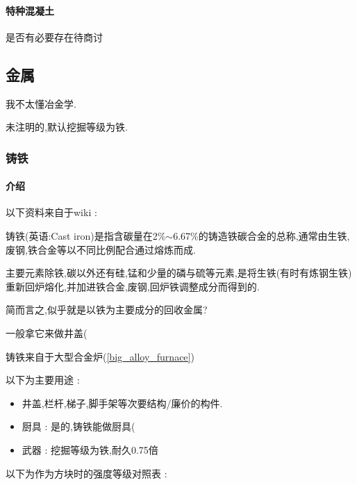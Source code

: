 {{{          \paragraph{特种混凝土}{
              是否有必要存在待商讨
          }
      }

  }

  \subsection{金属}{
      我不太懂冶金学.

      未注明的,默认挖掘等级为铁.

      \subsubsection{铸铁}{
          \paragraph{介绍}{
              以下资料来自于wiki :

              铸铁(英语:Cast iron)是指含碳量在2\%$\sim$6.67\%的铸造铁碳合金的总称,通常由生铁,废钢,铁合金等以不同比例配合通过熔炼而成.

              主要元素除铁,碳以外还有硅,锰和少量的磷与硫等元素,是将生铁(有时有炼钢生铁)重新回炉熔化,并加进铁合金,废钢,回炉铁调整成分而得到的.

              简而言之,似乎就是以铁为主要成分的回收金属?

              一般拿它来做井盖(
          }

          铸铁来自于大型合金炉({\ref{big_alloy_furnace}})

          以下为主要用途 :
          \begin{itemize}[itemsep=1pt]
              \item 井盖,栏杆,梯子,脚手架等次要结构/廉价的构件.
              \item 厨具 : 是的,铸铁能做厨具(
              \item 武器 : 挖掘等级为铁,耐久0.75倍
          \end{itemize}

          以下为作为方块时的强度等级对照表 :

}}}
